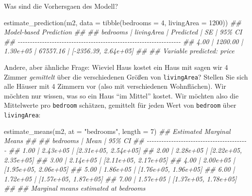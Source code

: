 \documentclass[
  a4paper,
  DIV=11]{scrreprt}
\newenvironment{Shaded}{\begin{snugshade}}{\end{snugshade}}
\newcommand{\AttributeTok}[1]{\textcolor[rgb]{0.40,0.45,0.13}{#1}}
\newcommand{\DecValTok}[1]{\textcolor[rgb]{0.68,0.00,0.00}{#1}}
\newcommand{\DocumentationTok}[1]{\textcolor[rgb]{0.37,0.37,0.37}{\textit{#1}}}
\newcommand{\FunctionTok}[1]{\textcolor[rgb]{0.28,0.35,0.67}{#1}}
\newcommand{\NormalTok}[1]{\textcolor[rgb]{0.00,0.23,0.31}{#1}}
\newcommand{\StringTok}[1]{\textcolor[rgb]{0.13,0.47,0.30}{#1}}
\theoremstyle{definition}
\theoremstyle{remark}
\begin{document}
Was sind die Vorhersgaen des Modell?

\begin{Shaded}
\begin{Highlighting}[]
\FunctionTok{estimate\_prediction}\NormalTok{(m2, }\AttributeTok{data =} \FunctionTok{tibble}\NormalTok{(}\AttributeTok{bedrooms =} \DecValTok{4}\NormalTok{, }\AttributeTok{livingArea =} \DecValTok{1200}\NormalTok{))}
\DocumentationTok{\#\# Model{-}based Prediction}
\DocumentationTok{\#\# }
\DocumentationTok{\#\# bedrooms | livingArea | Predicted |       SE |               95\% CI}
\DocumentationTok{\#\# {-}{-}{-}{-}{-}{-}{-}{-}{-}{-}{-}{-}{-}{-}{-}{-}{-}{-}{-}{-}{-}{-}{-}{-}{-}{-}{-}{-}{-}{-}{-}{-}{-}{-}{-}{-}{-}{-}{-}{-}{-}{-}{-}{-}{-}{-}{-}{-}{-}{-}{-}{-}{-}{-}{-}{-}{-}{-}{-}{-}{-}{-}{-}{-}{-}{-}{-}}
\DocumentationTok{\#\# 4.00     |    1200.00 |  1.30e+05 | 67557.16 | [{-}2356.39, 2.64e+05]}
\DocumentationTok{\#\# }
\DocumentationTok{\#\# Variable predicted: price}
\end{Highlighting}
\end{Shaded}

Andere, aber ähnliche Frage: Wieviel Haus kostet ein Haus mit sagen wir
4 Zimmer \emph{gemittelt} über die verschiedenen Größen von
\texttt{livingArea}? Stellen Sie sich alle Häuser mit 4 Zimmern vor
(also mit verschiedenen Wohnflächen). Wir möchten nur wissen, was so ein
Haus ``im Mittel'' kostet. Wir möchten also die Mittelwerte pro
\texttt{bedroom} schätzen, gemittelt für jeden Wert von \texttt{bedroom}
über \texttt{livingArea}:

\begin{Shaded}
\begin{Highlighting}[]
\FunctionTok{estimate\_means}\NormalTok{(m2, }\AttributeTok{at =} \StringTok{"bedrooms"}\NormalTok{, }\AttributeTok{length =} \DecValTok{7}\NormalTok{)}
\DocumentationTok{\#\# Estimated Marginal Means}
\DocumentationTok{\#\# }
\DocumentationTok{\#\# bedrooms |     Mean |               95\% CI}
\DocumentationTok{\#\# {-}{-}{-}{-}{-}{-}{-}{-}{-}{-}{-}{-}{-}{-}{-}{-}{-}{-}{-}{-}{-}{-}{-}{-}{-}{-}{-}{-}{-}{-}{-}{-}{-}{-}{-}{-}{-}{-}{-}{-}{-}{-}}
\DocumentationTok{\#\# 1.00     | 2.43e+05 | [2.31e+05, 2.54e+05]}
\DocumentationTok{\#\# 2.00     | 2.28e+05 | [2.22e+05, 2.35e+05]}
\DocumentationTok{\#\# 3.00     | 2.14e+05 | [2.11e+05, 2.17e+05]}
\DocumentationTok{\#\# 4.00     | 2.00e+05 | [1.95e+05, 2.06e+05]}
\DocumentationTok{\#\# 5.00     | 1.86e+05 | [1.76e+05, 1.96e+05]}
\DocumentationTok{\#\# 6.00     | 1.72e+05 | [1.57e+05, 1.87e+05]}
\DocumentationTok{\#\# 7.00     | 1.57e+05 | [1.37e+05, 1.78e+05]}
\DocumentationTok{\#\# }
\DocumentationTok{\#\# Marginal means estimated at bedrooms}
\end{Highlighting}
\end{Shaded}
\end{document}
